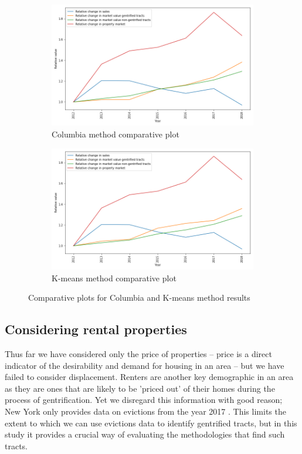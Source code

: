 \begin{figure}[h]
\centering
\begin{subfigure}{.5\textwidth}
  \centering
  \includegraphics[width=1.0\linewidth]{figs/columbia_summary.png}
  \caption{Columbia method comparative plot}
  \label{columbia_summary}
\end{subfigure}%
\begin{subfigure}{.5\textwidth}
  \centering
  \includegraphics[width=1.0\linewidth]{figs/k_means_summary.png}
  \caption{K-means method comparative plot}
  \label{k_means_summary}
\end{subfigure}
\caption{Comparative plots for Columbia and K-means method results}
\label{methods_summary_plot}
\end{figure}

\subsection{Considering rental properties}

Thus far we have considered only the price of properties -- price is a direct indicator of the desirability and demand for housing in an area -- but we have failed to consider displacement. Renters are another key demographic in an area as they are ones that are likely to be 'priced out' of their homes during the process of gentrification. Yet we disregard this information with good reason; New York only provides data on evictions from the year 2017 \cite{Evictions data}. This limits the extent to which we can use evictions data to identify gentrified tracts, but in this study it provides a crucial way of evaluating the methodologies that find such tracts. 

